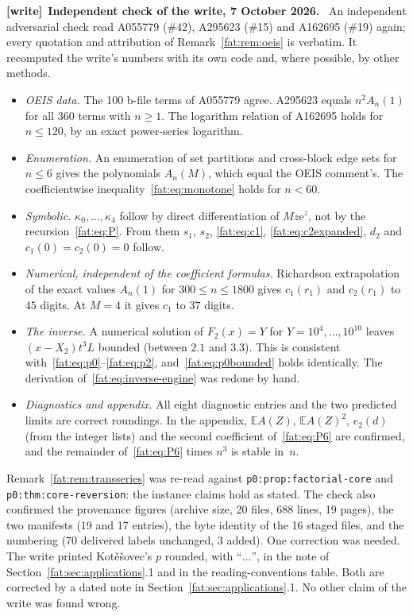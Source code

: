 \documentclass[11pt,letterpaper]{article}
\numberwithin{equation}{section}
\newcommand{\file}[1]{\nolinkurl{#1}}
\newenvironment{writenote}[1][]{\par\smallskip\begingroup\small
 \noindent\textbf{[write]}\if\relax\detokenize{#1}\relax\else~\textbf{#1.}\fi\ }%
 {\par\endgroup\smallskip}
\theoremstyle{remark}\newtheorem{remark}[theorem]{Remark}
\newcommand{\E}{\mathbb E}\newcommand{\Prob}{\mathbb P}\newcommand{\ee}{\mathrm e}
\begin{document}
\begin{writenote}[Independent check of the write, 7 October 2026]
An independent adversarial check read A055779 (\#42), A295623 (\#15) and A162695 (\#19) again; every quotation and attribution of Remark~\ref{fat:rem:oeis} is verbatim. It recomputed the write's numbers with its own code and, where possible, by other methods.
\begin{itemize}
\item \emph{OEIS data.} The 100 b-file terms of A055779 agree. A295623 equals $n^2A_n(1)$ for all 360 terms with $n\ge1$. The logarithm relation of A162695 holds for $n\le120$, by an exact power-series logarithm.
\item \emph{Enumeration.} An enumeration of set partitions and cross-block edge sets for $n\le6$ gives the polynomials $A_n(M)$, which equal the OEIS comment's. The coefficientwise inequality~\eqref{fat:eq:monotone} holds for $n<60$.
\item \emph{Symbolic.} $\kappa_0,\ldots,\kappa_4$ follow by direct differentiation of $Mz\ee^z$, not by the recursion~\eqref{fat:eq:P}. From them $s_1$, $s_2$, \eqref{fat:eq:c1}, \eqref{fat:eq:c2expanded}, $d_2$ and $c_1(0)=c_2(0)=0$ follow.
\item \emph{Numerical, independent of the coefficient formulas.} Richardson extrapolation of the exact values $A_n(1)$ for $300\le n\le1800$ gives $c_1(r_1)$ and $c_2(r_1)$ to $45$ digits. At $M=4$ it gives $c_1$ to $37$ digits.
\item \emph{The inverse.} A numerical solution of $F_2(x)=Y$ for $Y=10^4,\ldots,10^{10}$ leaves $(x-X_2)t^3L$ bounded (between $2.1$ and $3.3$). This is consistent with~\eqref{fat:eq:p0}--\eqref{fat:eq:p2}, and~\eqref{fat:eq:p0bounded} holds identically. The derivation of~\eqref{fat:eq:inverse-engine} was redone by hand.
\item \emph{Diagnostics and appendix.} All eight diagnostic entries and the two predicted limits are correct roundings. In the appendix, $\E A(Z)$, $\E A(Z)^2$, $e_2(d)$ (from the integer lists) and the second coefficient of~\eqref{fat:eq:P6} are confirmed, and the remainder of~\eqref{fat:eq:P6} times $n^3$ is stable in~$n$.
\end{itemize}
Remark~\ref{fat:rem:transseries} was re-read against \file{p0:prop:factorial-core} and \file{p0:thm:core-reversion}: the instance claims hold as stated. The check also confirmed the provenance figures (archive size, 20 files, 688 lines, 19 pages), the two manifests (19 and 17 entries), the byte identity of the 16 staged files, and the numbering (70 delivered labels unchanged, 3 added). One correction was needed. The write printed Kot\v{e}\v{s}ovec's $p$ rounded, with ``$\ldots$'', in the note of Section~\ref{fat:sec:applications}.1 and in the reading-conventions table. Both are corrected by a dated note in Section~\ref{fat:sec:applications}.1. No other claim of the write was found wrong.
\end{writenote}
\end{document}
